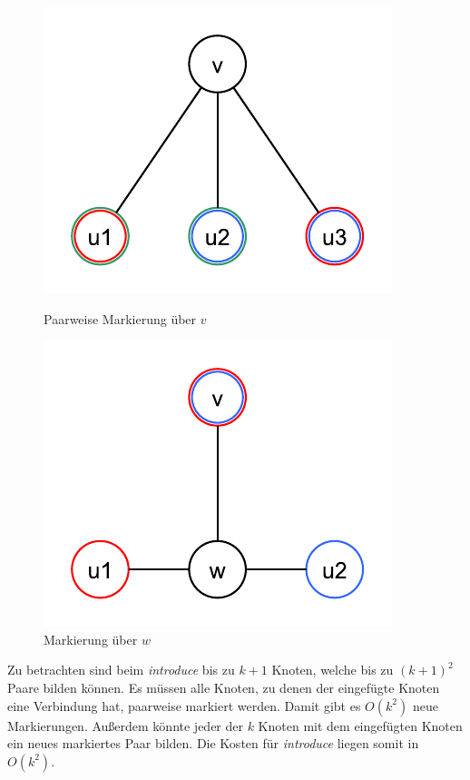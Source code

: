 \begin{itemize}
\begin{figure}[h]
	\center
	\begin{minipage}{0.45\linewidth}
		\center
		\includegraphics[scale=0.4]{fig/03-1b-markierung1}
		\caption{Paarweise Markierung über $v$}
		\label{03-1b-markierung1}	
	\end{minipage}	    
    \begin{minipage}{0.45\linewidth}
    	\center
		\includegraphics[scale=0.4]{fig/03-1b-markierung2}
		\caption{Markierung über $w$}
		\label{03-1b-markeirung2}	
	\end{minipage}	    
\end{figure}

Zu betrachten sind beim \textit{introduce} bis zu $k+1$ Knoten, welche bis zu $(k+1)^2$ Paare bilden können. Es müssen alle Knoten, zu denen der eingefügte Knoten eine Verbindung hat, paarweise markiert werden. Damit gibt es $O(k^2)$ neue Markierungen. Außerdem könnte jeder der $k$ Knoten mit dem eingefügten Knoten ein neues markiertes Paar bilden. Die Kosten für \textit{introduce} liegen somit in $O(k^2)$.


\end{itemize}

